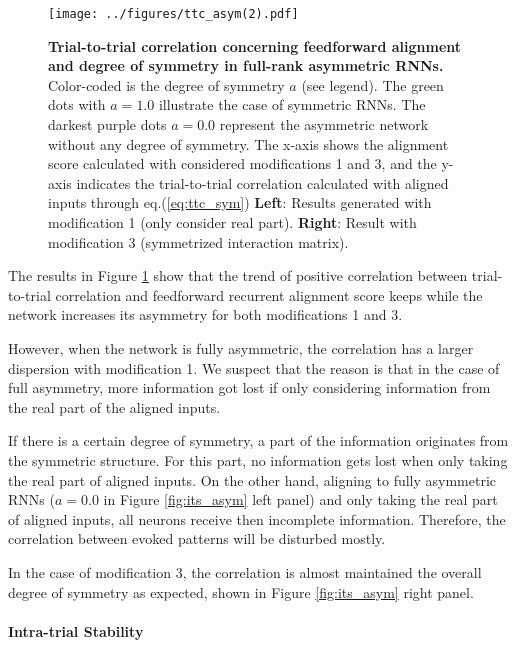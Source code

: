 \documentclass[11pt]{article}
\begin{document}
		\begin{figure}[H]
			\centering
			\texttt{[image: ../figures/ttc\_asym(2).pdf]}
			\caption[Trial-to-trial correlation concerning feedforward alignment and degree of symmetry in full-rank asymmetric RNNs]{\textbf{Trial-to-trial correlation concerning feedforward alignment and degree of symmetry in full-rank asymmetric RNNs.} Color-coded is the degree of symmetry $a$ (see legend). The green dots with $a=1.0$ illustrate the case of symmetric RNNs. The darkest purple dots $a=0.0$ represent the asymmetric network without any degree of symmetry. The x-axis shows the alignment score calculated with considered modifications 1 and 3, and the y-axis indicates the trial-to-trial correlation calculated with aligned inputs through eq.(\ref{eq:ttc_sym}) \textbf{Left}: Results generated with modification 1 (only consider real part). \textbf{Right}: Result with modification 3 (symmetrized interaction matrix).}
			\label{fig:ttc_asym}
		\end{figure}
	
	The results in Figure \ref{fig:ttc_asym} show that the trend of positive correlation between trial-to-trial correlation and feedforward recurrent alignment score keeps while the network increases its asymmetry for both modifications 1 and 3. 
	
	However, when the network is fully asymmetric, the correlation has a larger dispersion with modification 1. We suspect that the reason is that in the case of full asymmetry, more information got lost if only considering information from the real part of the aligned inputs. 
	
	If there is a certain degree of symmetry, a part of the information originates from the symmetric structure. For this part, no information gets lost when only taking the real part of aligned inputs. On the other hand, aligning to fully asymmetric RNNs ($a = 0.0$ in Figure \ref{fig:its_asym} left panel) and only taking the real part of aligned inputs, all neurons receive then incomplete information. Therefore, the correlation between evoked patterns will be disturbed mostly. 
	
	In the case of modification 3, the correlation is almost maintained the overall degree of symmetry as expected, shown in Figure \ref{fig:its_asym} right panel. 
	
	\paragraph{Intra-trial Stability}
	
\end{document}
